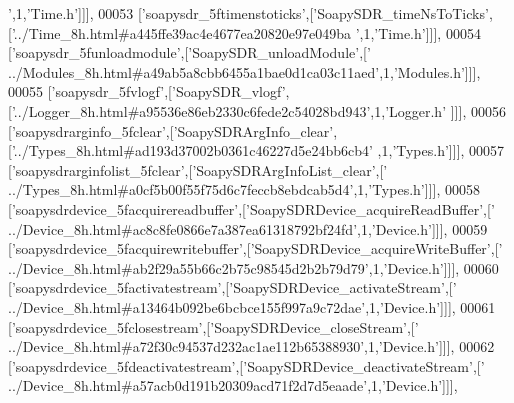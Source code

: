 \begin{DoxyCode}
{      '},1,\textcolor{stringliteral}{'Time.h'}]]],
00053   [\textcolor{stringliteral}{'soapysdr\_5ftimenstoticks'},[\textcolor{stringliteral}{'SoapySDR\_timeNsToTicks'},[\textcolor{stringliteral}{'../Time\_8h.html#a445ffe39ac4e4677ea20820e97e049ba
      '},1,\textcolor{stringliteral}{'Time.h'}]]],
00054   [\textcolor{stringliteral}{'soapysdr\_5funloadmodule'},[\textcolor{stringliteral}{'SoapySDR\_unloadModule'},[\textcolor{stringliteral}{'
      ../Modules\_8h.html#a49ab5a8cbb6455a1bae0d1ca03c11aed'},1,\textcolor{stringliteral}{'Modules.h'}]]],
00055   [\textcolor{stringliteral}{'soapysdr\_5fvlogf'},[\textcolor{stringliteral}{'SoapySDR\_vlogf'},[\textcolor{stringliteral}{'../Logger\_8h.html#a95536e86eb2330c6fede2c54028bd943'},1,\textcolor{stringliteral}{'Logger.h'}
      ]]],
00056   [\textcolor{stringliteral}{'soapysdrarginfo\_5fclear'},[\textcolor{stringliteral}{'SoapySDRArgInfo\_clear'},[\textcolor{stringliteral}{'../Types\_8h.html#ad193d37002b0361c46227d5e24bb6cb4'}
      ,1,\textcolor{stringliteral}{'Types.h'}]]],
00057   [\textcolor{stringliteral}{'soapysdrarginfolist\_5fclear'},[\textcolor{stringliteral}{'SoapySDRArgInfoList\_clear'},[\textcolor{stringliteral}{'
      ../Types\_8h.html#a0cf5b00f55f75d6c7feccb8ebdcab5d4'},1,\textcolor{stringliteral}{'Types.h'}]]],
00058   [\textcolor{stringliteral}{'soapysdrdevice\_5facquirereadbuffer'},[\textcolor{stringliteral}{'SoapySDRDevice\_acquireReadBuffer'},[\textcolor{stringliteral}{'
      ../Device\_8h.html#ac8c8fe0866e7a387ea61318792bf24fd'},1,\textcolor{stringliteral}{'Device.h'}]]],
00059   [\textcolor{stringliteral}{'soapysdrdevice\_5facquirewritebuffer'},[\textcolor{stringliteral}{'SoapySDRDevice\_acquireWriteBuffer'},[\textcolor{stringliteral}{'
      ../Device\_8h.html#ab2f29a55b66c2b75c98545d2b2b79d79'},1,\textcolor{stringliteral}{'Device.h'}]]],
00060   [\textcolor{stringliteral}{'soapysdrdevice\_5factivatestream'},[\textcolor{stringliteral}{'SoapySDRDevice\_activateStream'},[\textcolor{stringliteral}{'
      ../Device\_8h.html#a13464b092be6bcbce155f997a9c72dae'},1,\textcolor{stringliteral}{'Device.h'}]]],
00061   [\textcolor{stringliteral}{'soapysdrdevice\_5fclosestream'},[\textcolor{stringliteral}{'SoapySDRDevice\_closeStream'},[\textcolor{stringliteral}{'
      ../Device\_8h.html#a72f30c94537d232ac1ae112b65388930'},1,\textcolor{stringliteral}{'Device.h'}]]],
00062   [\textcolor{stringliteral}{'soapysdrdevice\_5fdeactivatestream'},[\textcolor{stringliteral}{'SoapySDRDevice\_deactivateStream'},[\textcolor{stringliteral}{'
      ../Device\_8h.html#a57acb0d191b20309acd71f2d7d5eaade'},1,\textcolor{stringliteral}{'Device.h'}]]],

\end{DoxyCode}
